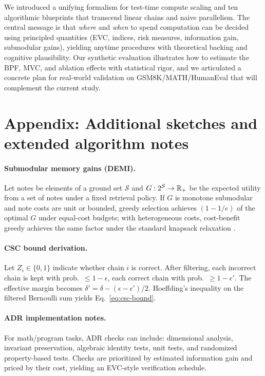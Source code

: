 We introduced a unifying formalism for test-time compute scaling and ten algorithmic blueprints that transcend linear chains and naive parallelism. 
The central message is that \emph{where} and \emph{when} to spend computation can be decided using principled quantities (EVC, indices, risk measures, information gain, submodular gains), yielding anytime procedures with theoretical backing and cognitive plausibility.
Our synthetic evaluation illustrates how to estimate the BPF, MVC, and ablation effects with statistical rigor, and we articulated a concrete plan for real-world validation on GSM8K/MATH/HumanEval that will complement the current study.

\appendix

\section*{Appendix: Additional sketches and extended algorithm notes}

\paragraph{Submodular memory gains (DEMI).}
Let notes be elements of a ground set $\mathcal{S}$ and $G:2^{\mathcal{S}}\to\mathbb{R}_+$ be the expected utility from a set of notes under a fixed retrieval policy. If $G$ is monotone submodular and note costs are unit or bounded, greedy selection achieves $(1-1/e)$ of the optimal $G$ under equal-cost budgets; with heterogeneous costs, cost-benefit greedy achieves the same factor under the standard knapsack relaxation \cite{sviridenko2004}.

\paragraph{CSC bound derivation.}
Let $Z_i \in \{0,1\}$ indicate whether chain $i$ is correct. After filtering, each incorrect chain is kept with prob.\ $\le 1-\epsilon$, each correct chain with prob.\ $\ge 1-\epsilon'$. The effective margin becomes $\delta'=\delta - (\epsilon-\epsilon')/2$. Hoeffding's inequality \cite{hoeffding1963} on the filtered Bernoulli sum yields Eq.~\eqref{eq:csc-bound}.

\paragraph{ADR implementation notes.}
For math/program tasks, ADR checks can include: dimensional analysis, invariant preservation, algebraic identity tests, unit tests, and randomized property-based tests. Checks are prioritized by estimated information gain and priced by their cost, yielding an EVC-style verification schedule.

